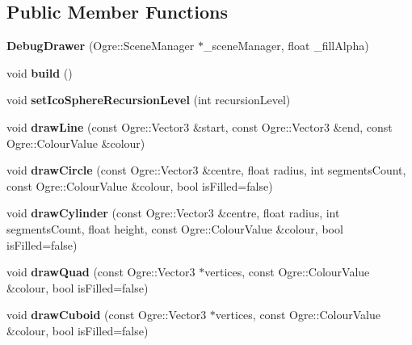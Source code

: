 \subsection*{Public Member Functions}
\begin{DoxyCompactItemize}
\item 
\hypertarget{class_debug_drawer_a7cb360171f2209e271dbdb353a57da29}{{\bfseries Debug\-Drawer} (Ogre\-::\-Scene\-Manager $\ast$\-\_\-scene\-Manager, float \-\_\-fill\-Alpha)}\label{class_debug_drawer_a7cb360171f2209e271dbdb353a57da29}

\item 
\hypertarget{class_debug_drawer_a4c94a09fac8cc826ae569dc0b735470e}{void {\bfseries build} ()}\label{class_debug_drawer_a4c94a09fac8cc826ae569dc0b735470e}

\item 
\hypertarget{class_debug_drawer_a7fd058d2116a2f0ef0ca54ee1d07afc0}{void {\bfseries set\-Ico\-Sphere\-Recursion\-Level} (int recursion\-Level)}\label{class_debug_drawer_a7fd058d2116a2f0ef0ca54ee1d07afc0}

\item 
\hypertarget{class_debug_drawer_aefcd3e33bc435c9107bbcf502224d6a6}{void {\bfseries draw\-Line} (const Ogre\-::\-Vector3 \&start, const Ogre\-::\-Vector3 \&end, const Ogre\-::\-Colour\-Value \&colour)}\label{class_debug_drawer_aefcd3e33bc435c9107bbcf502224d6a6}

\item 
\hypertarget{class_debug_drawer_a1eae1b0a9536d8f1f6af2d182beeb1c6}{void {\bfseries draw\-Circle} (const Ogre\-::\-Vector3 \&centre, float radius, int segments\-Count, const Ogre\-::\-Colour\-Value \&colour, bool is\-Filled=false)}\label{class_debug_drawer_a1eae1b0a9536d8f1f6af2d182beeb1c6}

\item 
\hypertarget{class_debug_drawer_aa582fdbb8678c3f183be8d08c3fe33ad}{void {\bfseries draw\-Cylinder} (const Ogre\-::\-Vector3 \&centre, float radius, int segments\-Count, float height, const Ogre\-::\-Colour\-Value \&colour, bool is\-Filled=false)}\label{class_debug_drawer_aa582fdbb8678c3f183be8d08c3fe33ad}

\item 
\hypertarget{class_debug_drawer_ab950e2c862842897cfdc22726a1469f1}{void {\bfseries draw\-Quad} (const Ogre\-::\-Vector3 $\ast$vertices, const Ogre\-::\-Colour\-Value \&colour, bool is\-Filled=false)}\label{class_debug_drawer_ab950e2c862842897cfdc22726a1469f1}

\item 
\hypertarget{class_debug_drawer_a50b17ab0d65f002d22cce2a3dfbe4f78}{void {\bfseries draw\-Cuboid} (const Ogre\-::\-Vector3 $\ast$vertices, const Ogre\-::\-Colour\-Value \&colour, bool is\-Filled=false)}\label{class_debug_drawer_a50b17ab0d65f002d22cce2a3dfbe4f78}


\end{DoxyCompactItemize}
